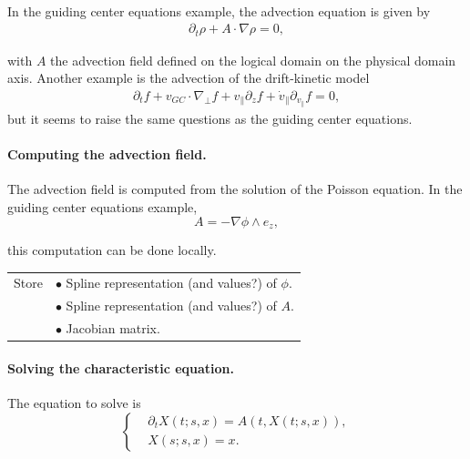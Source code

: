 \documentclass[presentation.tex]{subfiles}
\begin{document}
\paragraph{}
In the guiding center equations example, the advection equation is given by 
\begin{equation}
\begin{aligned}
	\partial_t \rho + A\cdot\nabla \rho = 0,
\end{aligned}
\end{equation}

with $A$ the advection field defined on the logical domain on the physical domain axis. Another example is the advection of the drift-kinetic model 
\begin{equation}
\begin{aligned}
	\partial_t f 
		+ v_{GC}\cdot \nabla_{\perp}f 
		+ v_{\parallel} \partial_z f 
		+ \dot{v}_{\parallel} \partial_{v_{\parallel}} f
		= 0,
\end{aligned}
\end{equation}
but it seems to raise the same questions as the guiding center equations.


\paragraph{Computing the advection field.}
The advection field is computed from the solution of the Poisson equation. In the guiding center equations example,
\begin{equation}
	A = - \nabla \phi \wedge e_z,
\end{equation}

this computation can be done locally. 


\begin{center}
\begin{tabular}{ |l|l| } 
 \hline
 Store 	& $\bullet$ Spline representation (and values?) of $\phi$. \\
 		& $\bullet$ Spline representation (and values?) of $A$. \\
  		& $\bullet$ Jacobian matrix. \\
 \hline
\end{tabular}
\end{center}


\paragraph{Solving the characteristic equation. }
The equation to solve is 
\begin{equation}
\left\{
\begin{aligned}
	& \partial_t X(t; s, x)  = A(t,X(t; s, x)), \\
	& X(s; s, x) = x.
\end{aligned}
\right.
\end{equation}
\end{document}
